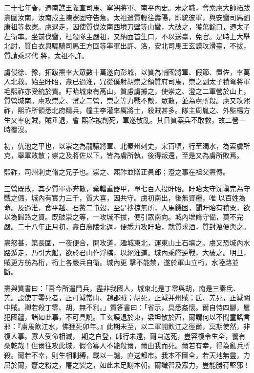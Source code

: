 \begin{pinyinscope}
 二十七年春，遷南譙王義宣司馬、寧朔將軍、南平內史。未之職，會索虜大帥拓跋燾圍汝南，汝南戍主陳憲固守告急。太祖遣質輕往壽陽，即統彼軍，與安蠻司馬劉康祖等救憲。虜退走，因使質伐汝南西境刀壁等山蠻，大破之，獲萬餘口，遷太子左衛率。坐前伐蠻，枉殺隊主嚴祖，又納面首生口，不以送臺，免官。是時上大舉北討，質白衣與驃騎司馬王方回等率軍出許、洛，安北司馬王玄謨攻滑臺，不拔，質請乘驛代
 將，太祖不許。



 虜侵徐、豫，拓跋燾率大眾數十萬遂向彭城，以質為輔國將軍、假節、置佐，率萬人北救。始至盱眙，燾已過淮，冗從僕射胡崇之領質府司馬，崇之副太子積弩將軍毛熙祚亦受統於質。盱眙城東有高山，質慮虜據之，使崇之、澄之二軍營於山上，質營城南。虜攻崇之、澄之二營，崇之等力戰不敵，眾散，並為虜所殺。虜又攻熙祚，熙祚所領悉北府精兵，幢主李灌率厲將士，殺賊甚多。隊主周胤之、外監楊方生又率射賊，賊垂退，會
 熙祚被創死，軍遂散亂。其日質案兵不敢救，故二營一時覆沒。



 初，仇池之平也，以崇之為龍驤將軍、北秦州刺史，宋百頃，行至濁水，為索虜所克，舉軍敗散；崇之及將佐以下，皆為虜所執，後得叛還，至是又為虜所敗焉。



 熙祚，司州刺史脩之兄子也。崇之、熙祚並贈正員郎；澄之事在祖父燾傳。



 三營既敗，其夕質軍亦奔散，棄輜重器甲，單七百人投盱眙。盱眙太守沈璞完為守戰之備，城內有實力三千，質大喜，因共守。虜初南出，後無資糧，唯
 以百姓為命。及過淮，食平越、石鱉二屯穀，至是抄掠無所，人馬饑困，聞盱眙有積粟，欲以為歸路之資。既破崇之等，一攻城不拔，便引眾南向。城內增脩守備，莫不完嚴。二十八年正月初，燾自廣陵北返，便悉力攻盱眙，就質求酒，質封溲便與之。



 燾怒甚，築長圍，一夜便合，開攻道，趣城東北，運東山土石填之。虜又恐城內水路遁走，乃引大船，欲於君山作浮橋，以絕淮道。城內乘艦逆戰，大破之。明旦，賊更方舫為桁，桁上各嚴兵自衛。城內更
 擊不能禁，遂於軍山立桁，水陸路並斷。



 燾與質書曰：「吾今所遣鬥兵，盡非我國人，城東北是丁零與胡，南是三秦氐、羌。設使丁零死者，正可減常山、趙郡賊；胡死，正減并州賊；氐、羌死，正減關中賊。卿若殺丁零、胡，無不利。」質答書曰：「省示，具悉姦懷。爾自恃四腳，屢犯國疆，諸如此事，不可具說。王玄謨退於東，梁坦散於西，爾謂何以不聞童謠言邪：『虜馬飲江水，佛狸死卯年。』此期未至，以二軍開飲江之徑爾，冥期使然，非復人事。寡人受命相滅，
 期之白登，師行未遠，爾自送死，豈容復令生全，饗有桑乾哉！但爾往攻此城，假令寡人不能殺爾，爾由我而死。爾若有幸，得為亂兵所殺。爾若不幸，則生相剿縛，載以一驢，直送都市。我本不圖全，若天地無靈，力屈於爾，齏之粉之，屠之裂之，如此未足謝本朝。爾識智及眾力，豈能勝苻堅邪！




\end{pinyinscope}
